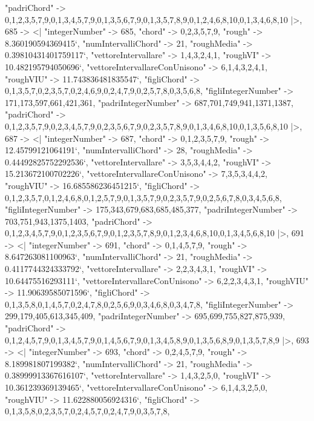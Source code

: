\documentclass[
]{article}
\begin{document}
\begin{DatasetVerbatim}
    "padriChord" -> {{0,1,2,3,5,7,9},{0,1,3,4,5,7,9},{0,1,3,5,6,7,9},{0,1,3,5,7,8,9},{0,1,2,4,6,8,10},{0,1,3,4,6,8,10}}
  |>,
  685 -> <|
    "integerNumber" -> 685,
    "chord" -> {0,2,3,5,7,9},
    "rough" -> 8.360190594369415`,
    "numIntervalliChord" -> 21,
    "roughMedia" -> 0.39810431401759117`,
    "vettoreIntervallare" -> {1,4,3,2,4,1},
    "roughVI" -> 10.482195794050696`,
    "vettoreIntervallareConUnisono" -> {6,1,4,3,2,4,1},
    "roughVIU" -> 11.743836481835547`,
    "figliChord" -> {{0,1,3,5,7},{0,2,3,5,7},{0,2,4,6,9},{0,2,4,7,9},{0,2,5,7,8},{0,3,5,6,8}},
    "figliIntegerNumber" -> {171,173,597,661,421,361},
    "padriIntegerNumber" -> {687,701,749,941,1371,1387},
    "padriChord" -> {{0,1,2,3,5,7,9},{0,2,3,4,5,7,9},{0,2,3,5,6,7,9},{0,2,3,5,7,8,9},{0,1,3,4,6,8,10},{0,1,3,5,6,8,10}}
  |>,
  687 -> <|
    "integerNumber" -> 687,
    "chord" -> {0,1,2,3,5,7,9},
    "rough" -> 12.45799121064191`,
    "numIntervalliChord" -> 28,
    "roughMedia" -> 0.44492825752292536`,
    "vettoreIntervallare" -> {3,5,3,4,4,2},
    "roughVI" -> 15.213672100702226`,
    "vettoreIntervallareConUnisono" -> {7,3,5,3,4,4,2},
    "roughVIU" -> 16.685586236451215`,
    "figliChord" -> {{0,1,2,3,5,7},{0,1,2,4,6,8},{0,1,2,5,7,9},{0,1,3,5,7,9},{0,2,3,5,7,9},{0,2,5,6,7,8},{0,3,4,5,6,8}},
    "figliIntegerNumber" -> {175,343,679,683,685,485,377},
    "padriIntegerNumber" -> {703,751,943,1375,1403},
    "padriChord" -> {{0,1,2,3,4,5,7,9},{0,1,2,3,5,6,7,9},{0,1,2,3,5,7,8,9},{0,1,2,3,4,6,8,10},{0,1,3,4,5,6,8,10}}
  |>,
  691 -> <|
    "integerNumber" -> 691,
    "chord" -> {0,1,4,5,7,9},
    "rough" -> 8.647263081100963`,
    "numIntervalliChord" -> 21,
    "roughMedia" -> 0.4117744324333792`,
    "vettoreIntervallare" -> {2,2,3,4,3,1},
    "roughVI" -> 10.64475516293111`,
    "vettoreIntervallareConUnisono" -> {6,2,2,3,4,3,1},
    "roughVIU" -> 11.90639585071596`,
    "figliChord" -> {{0,1,3,5,8},{0,1,4,5,7},{0,2,4,7,8},{0,2,5,6,9},{0,3,4,6,8},{0,3,4,7,8}},
    "figliIntegerNumber" -> {299,179,405,613,345,409},
    "padriIntegerNumber" -> {695,699,755,827,875,939},
    "padriChord" -> {{0,1,2,4,5,7,9},{0,1,3,4,5,7,9},{0,1,4,5,6,7,9},{0,1,3,4,5,8,9},{0,1,3,5,6,8,9},{0,1,3,5,7,8,9}}
  |>,
  693 -> <|
    "integerNumber" -> 693,
    "chord" -> {0,2,4,5,7,9},
    "rough" -> 8.189981807199382`,
    "numIntervalliChord" -> 21,
    "roughMedia" -> 0.38999913367616107`,
    "vettoreIntervallare" -> {1,4,3,2,5,0},
    "roughVI" -> 10.361239369139465`,
    "vettoreIntervallareConUnisono" -> {6,1,4,3,2,5,0},
    "roughVIU" -> 11.622880056924316`,
    "figliChord" -> {{0,1,3,5,8},{0,2,3,5,7},{0,2,4,5,7},{0,2,4,7,9},{0,3,5,7,8}},

\end{DatasetVerbatim}
\end{document}
